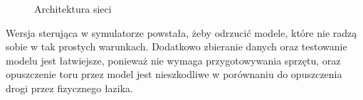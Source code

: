 \begin{figure}
  \centering
  \label{model}
  \caption{Architektura sieci}
\end{figure}
Wersja sterująca w symulatorze powstała, żeby odrzucić modele, które nie radzą
sobie w tak prostych warunkach. Dodatkowo zbieranie danych oraz testowanie
modelu jest łatwiejsze, ponieważ nie wymaga przygotowywania sprzętu, oraz
opuszczenie toru przez model jest nieszkodliwe w porównaniu do opuszczenia
drogi przez fizycznego łazika.

